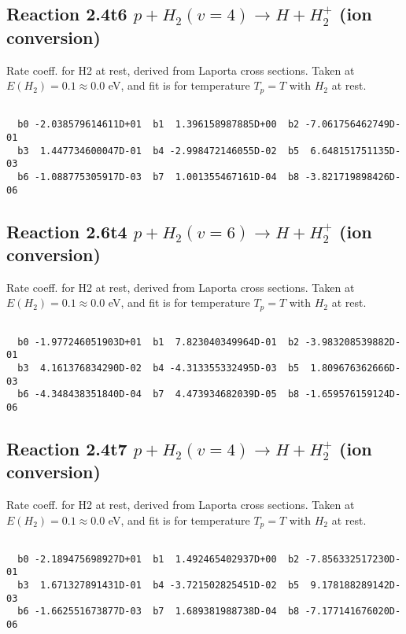 \documentclass[12pt,dvipdfmx]{article}
\begin{document}
\newpage
\subsection{
Reaction 2.4t6
$ p + H_2(v=4) \rightarrow H + H_2^+$ (ion conversion)
}
Rate coeff. for H2 at rest, derived from Laporta cross sections.
Taken at $E(H_2) = 0.1 \approx 0.0$ eV,  and fit is for temperature $T_p=T$ with $H_2$ at rest.

\begin{small}\begin{verbatim}

  b0 -2.038579614611D+01  b1  1.396158987885D+00  b2 -7.061756462749D-01
  b3  1.447734600047D-01  b4 -2.998472146055D-02  b5  6.648151751135D-03
  b6 -1.088775305917D-03  b7  1.001355467161D-04  b8 -3.821719898426D-06

\end{verbatim}\end{small}

\newpage
\subsection{
Reaction 2.6t4
$ p + H_2(v=6) \rightarrow H + H_2^+$ (ion conversion)
}
Rate coeff. for H2 at rest, derived from Laporta cross sections.
Taken at $E(H_2) = 0.1 \approx 0.0$ eV,  and fit is for temperature $T_p=T$ with $H_2$ at rest.

\begin{small}\begin{verbatim}

  b0 -1.977246051903D+01  b1  7.823040349964D-01  b2 -3.983208539882D-01
  b3  4.161376834290D-02  b4 -4.313355332495D-03  b5  1.809676362666D-03
  b6 -4.348438351840D-04  b7  4.473934682039D-05  b8 -1.659576159124D-06

\end{verbatim}\end{small}

\newpage
\subsection{
Reaction 2.4t7
$ p + H_2(v=4) \rightarrow H + H_2^+$ (ion conversion)
}
Rate coeff. for H2 at rest, derived from Laporta cross sections.
Taken at $E(H_2) = 0.1 \approx 0.0$ eV,  and fit is for temperature $T_p=T$ with $H_2$ at rest.

\begin{small}\begin{verbatim}

  b0 -2.189475698927D+01  b1  1.492465402937D+00  b2 -7.856332517230D-01
  b3  1.671327891431D-01  b4 -3.721502825451D-02  b5  9.178188289142D-03
  b6 -1.662551673877D-03  b7  1.689381988738D-04  b8 -7.177141676020D-06

\end{verbatim}\end{small}
\end{document}
